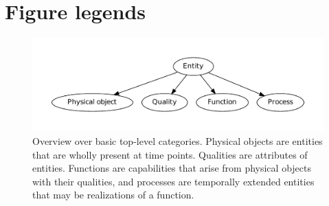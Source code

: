 \documentclass[12pt]{article}
\begin{document}


\clearpage

\section*{Figure legends}
\begin{figure}
  \centering
  \includegraphics[width=1\textwidth]{onto.pdf}
  \caption{Overview over basic top-level categories. Physical objects
    are entities that are wholly present at time points. Qualities are
    attributes of entities. Functions are capabilities that arise from
    physical objects with their qualities, and processes are
    temporally extended entities that may be realizations of a
    function.\label{fig:onto}}
\end{figure}
\end{document}

